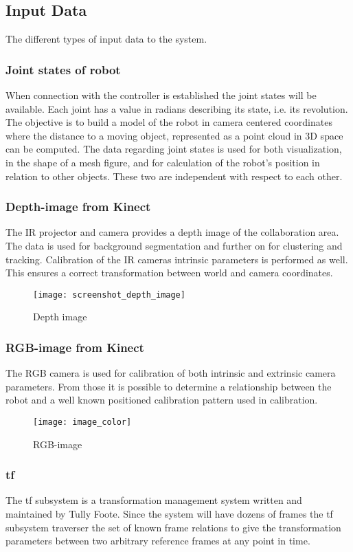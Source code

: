 \subsection{Input Data}
The different types of input data to the system.
\subsubsection{Joint states of robot}
When connection with the controller is established the joint states will be available. Each joint has a value in radians describing its state, i.e. its revolution. The objective is to build a model of the robot in camera centered coordinates where the distance to a moving object, represented as a point cloud in 3D space can be computed.
The data regarding joint states is used for both visualization, in the shape of a mesh figure, and for calculation of the robot's position in relation to other objects. These two are independent with respect to each other.

\subsubsection{Depth-image from Kinect}
The IR projector and camera provides a depth image of the collaboration area. The data is used for background segmentation and further on for clustering and tracking. Calibration of the IR cameras intrinsic parameters is performed as well. This ensures a correct transformation between world and camera coordinates.

\begin{figure}[H]
\begin{center}
\texttt{[image: screenshot\_depth\_image]}
\caption{Depth image}

\end{center}
\end{figure}

\subsubsection{RGB-image from Kinect}
The RGB camera is used for calibration of both intrinsic and extrinsic camera parameters. From those it is possible to determine a relationship between the robot and a well known positioned calibration pattern used in calibration. 

\begin{figure}[H]
\begin{center}
\texttt{[image: image\_color]}
\caption{RGB-image}

\end{center}
\end{figure}

\subsubsection{tf}
The tf subsystem is a transformation management system written and maintained by Tully Foote. Since the system will have dozens of frames the tf subsystem traverser the set of known frame relations to give the transformation parameters between two arbitrary reference frames at any point in time. 